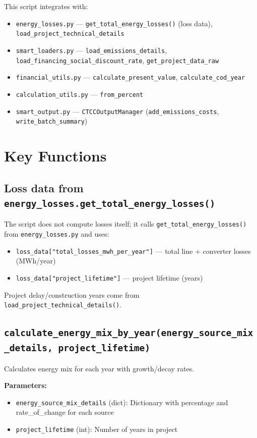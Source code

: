 \documentclass[ctcc_full_documentation.tex]{subfiles}
\begin{document}
This script integrates with:
\begin{itemize}
    \item \texttt{energy\_losses.py} --- \texttt{get\_total\_energy\_losses()} (loss data), \texttt{load\_project\_technical\_details}
    \item \texttt{smart\_loaders.py} --- \texttt{load\_emissions\_details}, \texttt{load\_financing\_social\_discount\_rate}, \texttt{get\_project\_data\_raw}
    \item \texttt{financial\_utils.py} --- \texttt{calculate\_present\_value}, \texttt{calculate\_cod\_year}
    \item \texttt{calculation\_utils.py} --- \texttt{from\_percent}
    \item \texttt{smart\_output.py} --- \texttt{CTCCOutputManager} (\texttt{add\_emissions\_costs}, \texttt{write\_batch\_summary})
\end{itemize}

\section{Key Functions}

\subsection{Loss data from \texttt{energy\_losses.get\_total\_energy\_losses()}}

The script does not compute losses itself; it calls \texttt{get\_total\_energy\_losses()} from \texttt{energy\_losses.py} and uses:
\begin{itemize}
    \item \texttt{loss\_data["total\_losses\_mwh\_per\_year"]} --- total line + converter losses (MWh/year)
    \item \texttt{loss\_data["project\_lifetime"]} --- project lifetime (years)
\end{itemize}
Project delay/construction years come from \texttt{load\_project\_technical\_details()}.

\subsection{\texttt{calculate\_energy\_mix\_by\_year(energy\_source\_mix\_details, project\_lifetime)}}

Calculates energy mix for each year with growth/decay rates.

\textbf{Parameters:}
\begin{itemize}
    \item \texttt{energy\_source\_mix\_details} (dict): Dictionary with percentage and rate\_of\_change for each source
    \item \texttt{project\_lifetime} (int): Number of years in project
\end{itemize}
\end{document}
